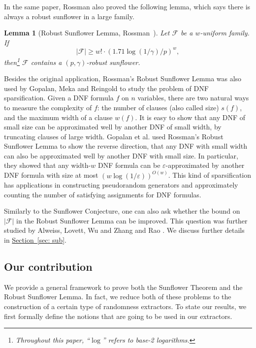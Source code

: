 \documentclass[11pt]{article}
\numberwithin{equation}{section}
\newtheorem{lemma}[theorem]{Lemma}
\theoremstyle{definition}
\theoremstyle{plain}
\newcommand{\expref}[2]{\hyperref[#2]{#1~\ref{#2}}}
\newcommand{\eps}{\varepsilon}
\newcommand{\calF}{\mathcal{F}} %
\begin{document}
In the same paper, Rossman also proved the following
%
%
%
lemma,
which says there is always a robust sunflower in a large family.
%

\begin{lemma}[Robust Sunflower Lemma, Rossman~\cite{rossman2010monotone}]
%
Let $\calF$ be a $w$-uniform family.  
If %
\[|\calF|\geq w!\cdot(1.71\log(1/\gamma)/p)^{w},\]
then\footnote{Throughout this paper, ``$\log$'' refers to
base-2 logarithms.}  %
$\calF$ contains a $(p, \gamma)$-robust sunflower.
\end{lemma}
%
%
%

Besides the original application, Rossman's Robust Sunflower Lemma 
was also used by Gopalan, Meka and Reingold \cite{gopalan2013dnf} 
to study the
problem of DNF sparsification. Given a DNF formula $f$ on $n$ variables, there are two natural ways to measure the complexity of $f$: the number of
clauses (also called size) $s(f)$, and the maximum width of a  clause $w(f)$. It is easy to show that any DNF of small size can be approximated well
by another DNF of small width, by truncating clauses of large width. Gopalan {et al.} \cite{gopalan2013dnf} used Rossman's Robust Sunflower Lemma to
show the reverse direction, that any DNF with small width can also be approximated well by another DNF with small size. In particular, they showed
that  any width-$w$ DNF formula can be $\eps$-approximated by another DNF formula with size at most $(w\log(1/\eps))^{O(w)}$. This kind of
sparsification has applications in constructing pseudorandom generators and approximately counting the number of satisfying assignments for DNF
formulas.

%
Similarly   %
to the Sunflower Conjecture, one can also ask whether the bound on $|\calF|$ in the Robust Sunflower Lemma can be improved. This question was further studied by Alweiss, Lovett, Wu and Zhang \cite{alweiss2020improved} and Rao \cite{rao2020coding}. We discuss further details in \expref{Section}{sec: sub}.

\subsection{Our contribution} We provide a general framework to prove both the Sunflower Theorem and the Robust Sunflower Lemma. In fact, we reduce
both of these problems to the construction of a certain type of randomness extractors. To state our results, we first formally define the notions
that are going to be used in our extractors.

%
%
%
\end{document}

